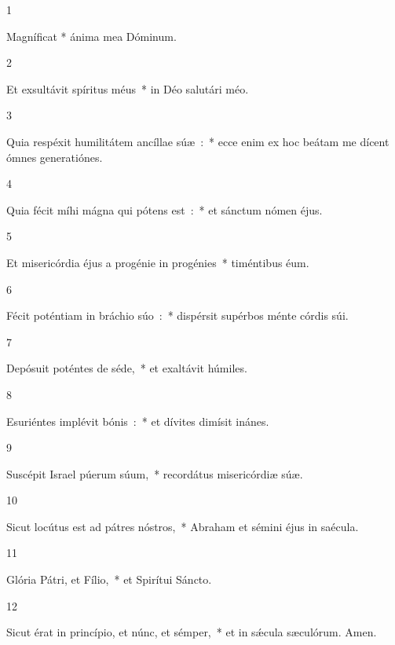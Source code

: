 \newHymn



\settowidth{\versewidth}{Et exsultávit spíritus méus~* in Déo salutári méo.}

\bigskip

{\parskip=0mm

\parbox{1em}{1} Magníficat * ánima mea Dóminum.

\pointtrans

\parbox{1em}{2} Et exsultávit spíritus méus~* in Déo salutári méo.

\parbox{1em}{3} Quia respéxit humilitátem ancíllae súæ~:~* ecce enim ex hoc beátam me dícent ómnes generatiónes.

\parbox{1em}{4} Quia fécit míhi mágna qui pótens est~:~* et sánctum nómen éjus.

\parbox{1em}{5} Et misericórdia éjus a progénie in progénies~* timéntibus éum.

\parbox{1em}{6} Fécit poténtiam in bráchio súo~:~* dispérsit supérbos ménte córdis súi.

\parbox{1em}{7} Depósuit poténtes de séde,~* et exaltávit húmiles.

\parbox{1em}{8} Esuriéntes implévit bónis~:~* et dívites dimísit inánes.

\parbox{1em}{9} Suscépit Israel púerum súum,~* recordátus misericórdiæ súæ.

\parbox{1em}{10} Sicut locútus est ad pátres nóstros,~* Abraham et sémini éjus in saécula.

\parbox{1em}{11} Glória Pátri, et Fílio,~* et Spirítui Sáncto.

\parbox{1em}{12} Sicut érat in princípio, et núnc, et sémper,~* et in sǽcula sæculórum. Amen.

}

\bigskip


\newHymn


\settowidth{\versewidth}{Et exsultávit spíritus méus~* in Déo salutári méo.}

\medskip

